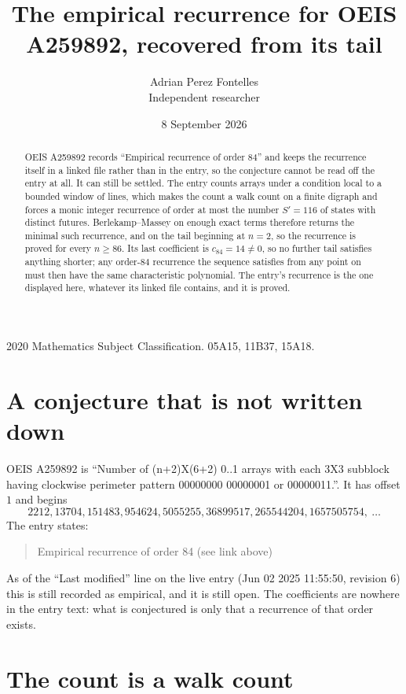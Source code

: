 \documentclass[11pt,a4paper]{article}
\title{The empirical recurrence for OEIS A259892, recovered from its tail}
\author{Adrian Perez Fontelles\\ \small Independent researcher}
\date{8 September 2026}
\theoremstyle{plain}
\theoremstyle{definition}
\begin{document}
\maketitle

\begin{abstract}
OEIS A259892 records ``Empirical recurrence of order $84$'' and keeps the recurrence itself in
a linked file rather than in the entry, so the conjecture cannot be read off the entry at all.
It can still be settled. The entry counts arrays under a condition local to a bounded window of
lines, which makes the count a walk count on a finite digraph and forces a monic integer
recurrence of order at most the number $S'=116$ of states with distinct futures. Berlekamp--Massey on
enough exact terms therefore returns the minimal such recurrence, and on the tail beginning at $n=2$, so the recurrence is proved for every $n\ge86$.
Its last coefficient is $c_{84}=14\neq0$, so no further tail satisfies anything
shorter; any order-$84$ recurrence the sequence satisfies from any point on must then have
the same characteristic polynomial. The entry's recurrence is the one displayed here, whatever
its linked file contains, and it is proved.
\end{abstract}

\noindent\small 2020 Mathematics Subject Classification. 05A15, 11B37, 15A18.\normalsize

\section{A conjecture that is not written down}

OEIS A259892 is ``Number of (n+2)X(6+2) 0..1 arrays with each 3X3 subblock having clockwise perimeter pattern 00000000 00000001 or 00000011.''. It has offset $1$ and begins
\[
2212, 13704, 151483, 954624, 5055255, 36899517, 265544204, 1657505754,\ \dots
\]
The entry states:
\begin{quote}
Empirical recurrence of order 84 (see link above)
\end{quote}
As of the ``Last modified'' line on the live entry (Jun 02 2025 11:55:50, revision 6)
this is still recorded as empirical, and it is still open. The coefficients are nowhere in the
entry text: what is conjectured is only that a recurrence of that order exists.

\section{The count is a walk count}
\end{document}

